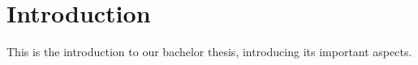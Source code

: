 \chapter*{Introduction}
This is the introduction to our bachelor thesis, introducing its important aspects.